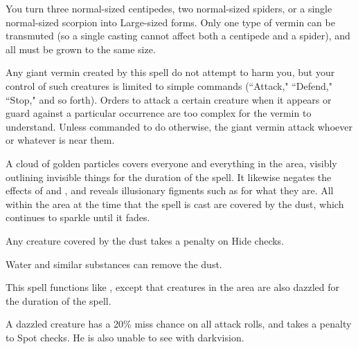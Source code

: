 \spellrng{\rngclose}
\spelldur{\durmed}
\begin{spelleffect}
  You turn three normal-sized centipedes, two normal-sized spiders, or a single normal-sized scorpion into Large-sized forms. Only one type of vermin can be transmuted (so a single casting cannot affect both a centipede and a spider), and all must be grown to the same size.
  \par Any giant vermin created by this spell do not attempt to harm you, but your control of such creatures is limited to simple commands (``Attack," ``Defend," ``Stop," and so forth). Orders to attack a certain creature when it appears or guard against a particular occurrence are too complex for the vermin to understand. Unless commanded to do otherwise, the giant vermin attack whoever or whatever is near them.
\end{spelleffect}

\spellrng{\rngmed}
\spelldur{\durshort}
\begin{spelleffect}
  A cloud of golden particles covers everyone and everything in the area, visibly outlining invisible things for the duration of the spell. It likewise negates the effects of  and , and reveals illusionary figments such as  for what they are. All within the area at the time that the spell is cast are covered by the dust, which continues to sparkle until it fades.
  \par Any creature covered by the dust takes a  penalty on Hide checks.
\end{spelleffect}
\begin{spelleffect}
  Water and similar substances can remove the dust.
\end{spelleffect}

\begin{spelleffect}
  This spell functions like , except that creatures in the area are also dazzled for the duration of the spell.
\end{spelleffect}
\begin{spellnotes}
  A dazzled creature has a 20\% miss chance on all attack rolls, and takes a  penalty to Spot checks. He is also unable to see with darkvision.
\end{spellnotes}

